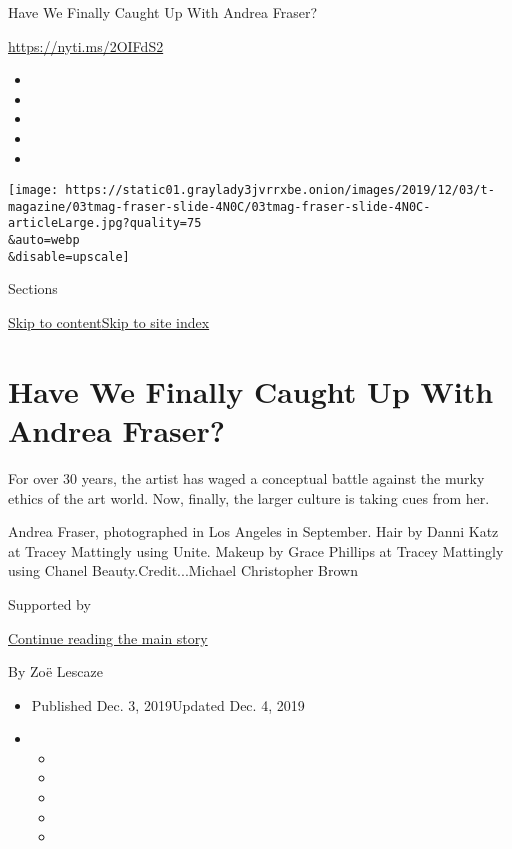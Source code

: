 Have We Finally Caught Up With Andrea Fraser?

\url{https://nyti.ms/2OIFdS2}

\begin{itemize}
\item
\item
\item
\item
\item
\end{itemize}

\texttt{[image: https://static01.graylady3jvrrxbe.onion/images/2019/12/03/t-magazine/03tmag-fraser-slide-4N0C/03tmag-fraser-slide-4N0C-articleLarge.jpg?quality=75\\\&auto=webp\\\&disable=upscale]}

Sections

\protect\hyperlink{site-content}{Skip to
content}\protect\hyperlink{site-index}{Skip to site index}

\hypertarget{have-we-finally-caught-up-with-andrea-fraser}{%
\section{Have We Finally Caught Up With Andrea
Fraser?}\label{have-we-finally-caught-up-with-andrea-fraser}}

For over 30 years, the artist has waged a conceptual battle against the
murky ethics of the art world. Now, finally, the larger culture is
taking cues from her.

Andrea Fraser, photographed in Los Angeles in September. Hair by Danni
Katz at Tracey Mattingly using Unite. Makeup by Grace Phillips at Tracey
Mattingly using Chanel Beauty.Credit...Michael Christopher Brown

Supported by

\protect\hyperlink{after-sponsor}{Continue reading the main story}

By Zoë Lescaze

\begin{itemize}
\item
  Published Dec. 3, 2019Updated Dec. 4, 2019
\item
  \begin{itemize}
  \item
  \item
  \item
  \item
  \item
  \end{itemize}
\end{itemize}

